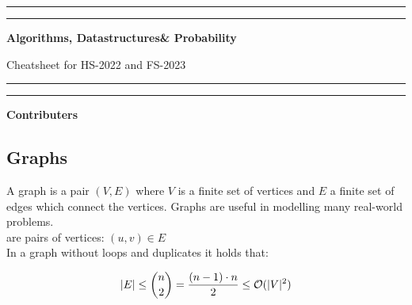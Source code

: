 \documentclass[a3paper, landscape, 11pt]{article} %
\begin{document}
\begin{multicols*}{4}{
\author{
	Louis Schell
}


\rule{\columnwidth}{0.4pt}\vspace*{-\baselineskip}\vspace{3.2pt} %
	\rule{\columnwidth}{1.6pt} %
\begin{center}
\textbf{\huge{Algorithms, Datastructures{\color{black!0}{,}}\& Probability}}

\vspace{12pt}
Cheatsheet for HS-2022 and FS-2023
\rule{\columnwidth}{0.4pt}\vspace*{-\baselineskip}\vspace{3.2pt} %
	\rule{\columnwidth}{1.6pt} %


\bigskip
\license

\vfill

{\large{\textbf{Contributers}}}

\smallskip

\theauthor

\end{center}




\newpage
{}
\subsection*{Graphs}
A graph is a pair $(V,E)$ where $V$ is a finite set of vertices and $E$ a finite set of edges which connect the vertices. Graphs are useful in modelling many real-world problems.\\

 are pairs of vertices: $(u,v) \in E$\\

In a graph without loops and duplicates it holds that:

$$
|E| \le \binom{n}{2} = \frac{(n-1) \cdot n}{2} \le \mathcal{O}(|V|^2) 
$$\\

}
\end{multicols*}
\end{document}
